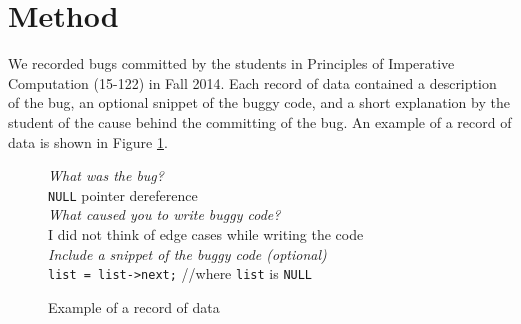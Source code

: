 \documentclass[11pt,letterpaper]{article}
\begin{document}
\section{Method}
\label{sec:method}

We recorded bugs committed by the students in Principles of Imperative Computation (15-122) in Fall 2014. Each record of data contained a description of the bug, an optional snippet of the buggy code, and a short explanation by the student of the cause behind the committing of the bug. An example of a record of data is shown in Figure \ref{fig:record}.\\ 

\begin{figure}
\begin{framed}
\emph{What was the bug?}\\
\verb|NULL| pointer dereference\\

\emph{What caused you to write buggy code?}\\
 I did not think of edge cases while writing the code\\

\emph{Include a snippet of the buggy code (optional)}\\
\verb|list = list->next;| //where \verb|list| is \verb|NULL|
\end{framed}
\caption{Example of a record of data}
\label{fig:record}
\end{figure}
\end{document}
